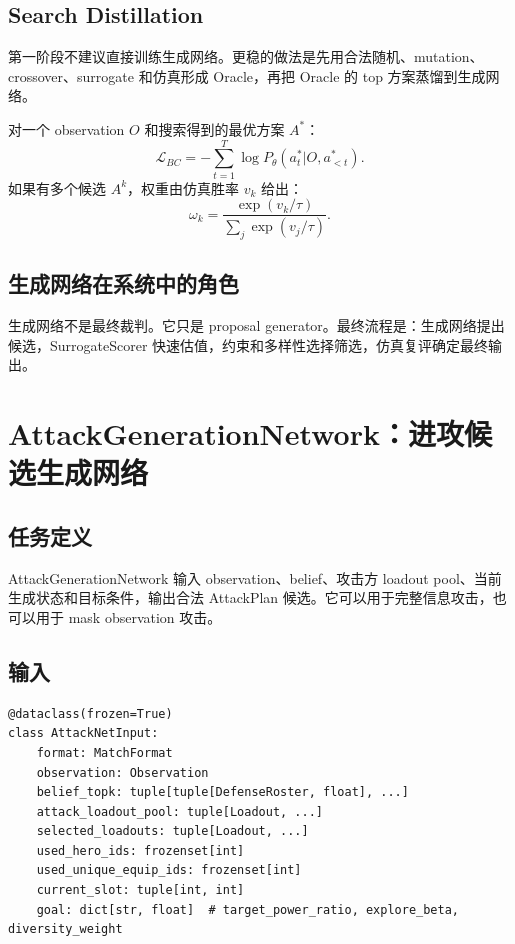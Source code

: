 \documentclass[UTF8,12pt,openany]{ctexbook}
\begin{document}
\section{Search Distillation}
第一阶段不建议直接训练生成网络。更稳的做法是先用合法随机、mutation、crossover、surrogate 和仿真形成 Oracle，再把 Oracle 的 top 方案蒸馏到生成网络。

对一个 observation $O$ 和搜索得到的最优方案 $A^*$：
\begin{equation}
\mathcal{L}_{BC}=-\sum_{t=1}^{T}\log P_\theta(a_t^*|O,a_{<t}^*).
\end{equation}
如果有多个候选 $A^k$，权重由仿真胜率 $v_k$ 给出：
\begin{equation}
\omega_k=\frac{\exp(v_k/\tau)}{\sum_j\exp(v_j/\tau)}.
\end{equation}

\section{生成网络在系统中的角色}
生成网络不是最终裁判。它只是 proposal generator。最终流程是：生成网络提出候选，SurrogateScorer 快速估值，约束和多样性选择筛选，仿真复评确定最终输出。


\chapter{AttackGenerationNetwork：进攻候选生成网络}

\section{任务定义}
AttackGenerationNetwork 输入 observation、belief、攻击方 loadout pool、当前生成状态和目标条件，输出合法 AttackPlan 候选。它可以用于完整信息攻击，也可以用于 mask observation 攻击。

\section{输入}
\begin{lstlisting}[caption={AttackNetInput}]
@dataclass(frozen=True)
class AttackNetInput:
    format: MatchFormat
    observation: Observation
    belief_topk: tuple[tuple[DefenseRoster, float], ...]
    attack_loadout_pool: tuple[Loadout, ...]
    selected_loadouts: tuple[Loadout, ...]
    used_hero_ids: frozenset[int]
    used_unique_equip_ids: frozenset[int]
    current_slot: tuple[int, int]
    goal: dict[str, float]  # target_power_ratio, explore_beta, diversity_weight
\end{lstlisting}
\end{document}

